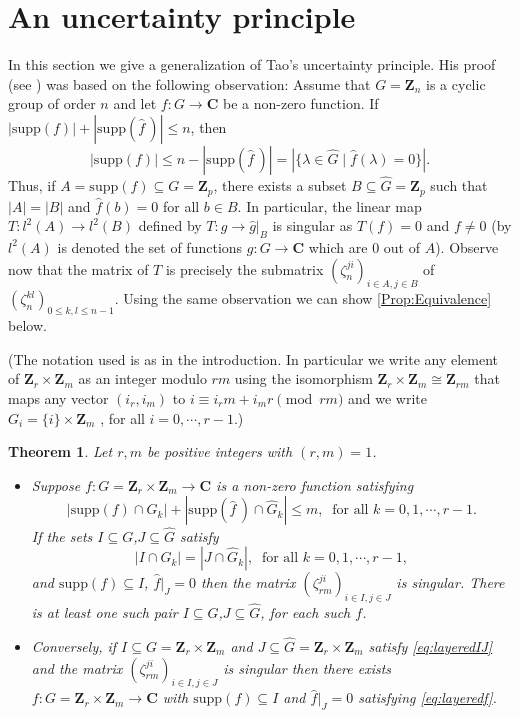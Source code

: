 \documentclass[10pt,a4paper]{amsart}
\newtheorem{theorem}{Theorem}
\def\Z{\mathbf{Z}}
\def\C{\mathbf{C}}
\def\supp{\mathrm{supp}}
\begin{document}
\section{An uncertainty principle}\label{Sec:Uncertainty}
In this section we give a generalization of Tao's uncertainty principle. His proof  (see \cite{Tao})
 was based on the following observation: Assume that $G =\Z_n$ is a cyclic group of order $n$ and let 
\( f: G \to \C \) be   a non-zero function. 
If \( |\supp(f)| + |\supp(\widehat{f} \, )| \leq n \), then  
\[ |\supp(f)| \leq n - |\supp(\widehat{f} \, )| = |\{ \lambda \in \widehat{G} \mid \widehat{f} (\lambda) = 0 \}|. \]
Thus, if $ A = \supp(f)\subseteq G=  \Z_p$, there exists a subset $ B \subseteq \widehat G= \Z_p $
such that $|A| = |B| $ and $ \widehat{f}(b) = 0 $ for all $ b \in B $. In particular, the linear map $T: l^2(A) \to l^2(B)$  defined by $T: g \to \widehat{g} |_B $ is singular as $T(f)=0$ and  $f\neq 0$ 
(by  $l^2(A)$ is denoted the set of functions $g: G \to \C$  which are 
$0$ out of $A$).
Observe now that the matrix of $T$ is precisely the submatrix $(\zeta_n^{ji})_{i\in A, j \in B}$ of $(\zeta_n^{kl})_{0 \leq k , l \leq n-1}$. 
Using the same  observation we can show \autoref{Prop:Equivalence} below.


(The notation used is as in the introduction. In particular we write any element of $\Z_r \times \Z_m$ as an integer modulo $rm$ using  the isomorphism $\Z_r \times \Z_m \cong \Z_{rm} $ that maps any vector  $(i_r, i_m)$  to $i\equiv i_rm +i_mr  \pmod {rm}$ and we write   $G_i= \{i\} \times \Z_m$ , for all $i=0, \cdots , r-1$.)




\begin{theorem}\label{Prop:Equivalence}
Let $r, m$ be positive integers with  $(r, m)=1$.
\begin{itemize}
\item[(a)]
Suppose $f : G=\Z_r \times \Z_m \to \C$  is  a non-zero function   satisfying  
\begin{equation}\label{eq:layeredf}
|\supp(f) \cap G_k| + |\supp(\widehat{f} \, ) \cap \widehat{G}_k| \leq m,  \ 
  \text{ for all } k=0,1, \cdots ,r-1.
\end{equation}
If the sets $I \subseteq G$,$J \subseteq \widehat{G}$ satisfy
\begin{equation}\label{eq:layeredIJ}
  |I \cap G_k|= |J \cap \widehat{G}_k|,\ \text{ for all } k=0,1, \cdots ,r-1,  
\end{equation}
and $\supp(f) \subseteq I$, $\widehat{f}|_J =0$ then the matrix $(\zeta_{rm}^{ji})_{i \in I, j \in J}$ is singular. There is at least one such pair $I \subseteq G$,$J \subseteq \widehat{G}$,  for each such $f$.
\item[(b)]
Conversely, if  $I \subseteq G =\Z_r \times \Z_m$ and $J \subseteq \widehat{G} = \Z_r \times \Z_m$  satisfy  \eqref{eq:layeredIJ} 
and the matrix $(\zeta_{rm}^{ji})_{i \in I, j \in J}$ is singular then there exists $f : G=\Z_r \times \Z_m \to \C$  with $\supp(f) \subseteq I$ and $\widehat{f}|_J = 0$ satisfying  \eqref{eq:layeredf}.
\end{itemize}

\end{theorem}
\end{document}
